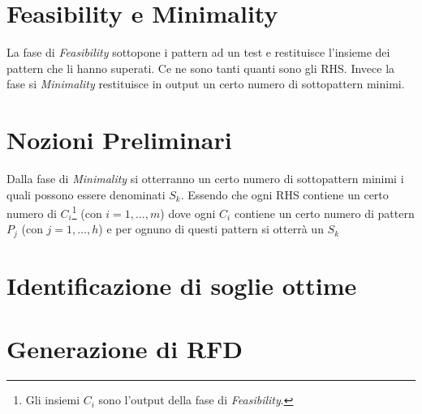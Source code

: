 \section{Feasibility e Minimality}
La fase di \textit{Feasibility} sottopone i pattern ad un test e restituisce l'insieme dei pattern che li hanno superati. Ce ne sono tanti quanti sono gli RHS. Invece la fase si \textit{Minimality} restituisce in output un certo numero di sottopattern minimi.
\section{Nozioni Preliminari}
Dalla fase di \textit{Minimality} si otterranno un certo numero di sottopattern minimi i quali possono essere denominati $S_{k}$. Essendo che ogni RHS contiene un certo numero di $C_{i}$\footnote{Gli insiemi $C_{i}$ sono l'output della fase di  \textit{Feasibility}.} (con $i=1,\dots,m$)  dove ogni $C_{i}$ contiene un certo numero di pattern $P_{j}$ (con $j = 1,\dots,h$) e per ognuno di questi pattern si otterrà un $S_{k}$

\section{Identificazione di soglie ottime}
\section{Generazione di RFD}